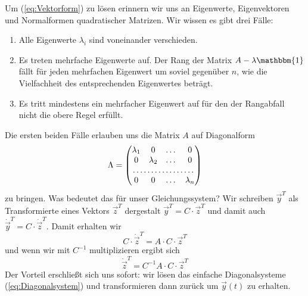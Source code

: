 Um (\ref{eq:Vektorform}) zu lösen erinnern wir uns an Eigenwerte, Eigenvektoren
und Normalformen quadratischer Matrizen. Wir wissen es gibt drei Fälle:
\begin{enumerate}
  \item Alle Eigenwerte $\lambda_i$ sind voneinander verschieden.
  \item Es treten mehrfache Eigenwerte auf. Der Rang der Matrix
    $A-\lambda\mathbbm{1}$ fällt für jeden mehrfachen Eigenwert um soviel
    gegenüber $n$, wie die Vielfachheit des entsprechenden Eigenwertes beträgt.
  \item Es tritt mindestens ein mehrfacher Eigenwert auf für den der Rangabfall
    nicht die obere Regel erfüllt.
\end{enumerate}
Die ersten beiden Fälle erlauben uns die Matrix $A$ auf Diagonalform 
\begin{equation}
  \Lambda=
  \begin{pmatrix}
    \lambda_1&0&\dots&0\\
    0&\lambda_2&\dots&0\\
    \multicolumn{4}{c}\dotfill\\
    0&0&\dots&\lambda_n
  \end{pmatrix}
  \label{eq:Diagonalform}
\end{equation}
zu bringen. Was bedeutet das für unser Gleichungssystem? Wir schreiben
$\vec{y}^T$ als Transformierte eines Vektors $\vec{z}^T$ dergestalt
$\vec{y}^T=C\cdot\vec{z}^T$ und damit auch $\dot{\vec{y}}^T = C\cdot
\dot{\vec{z}}^T$. Damit erhalten wir 
\[ C\cdot \dot{\vec{z}}^T = A\cdot C\cdot\vec{z}^T \]
und wenn wir mit $C^{-1}$ multiplizieren ergibt sich
\begin{equation}
  \dot{\vec{z}}^T = C^{-1}A\cdot C\cdot\vec{z}^T
  \label{eq:Diagonalsystem}
\end{equation}
Der Vorteil erschließt sich uns sofort: wir lösen das einfache Diagonalsysteme
(\ref{eq:Diagonalsystem}) und transformieren dann zurück um $\vec{y}(t)$ zu
erhalten.
%


